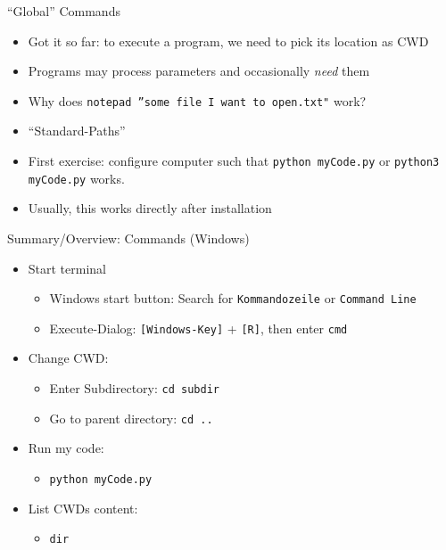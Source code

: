 \begin{frame}{\enquote{Global} Commands}
%
\begin{itemize}
\item Got it so far: to execute a program, we need to pick its location as CWD
\item Programs may process parameters and occasionally \emph{need} them
\item Why does \texttt{notepad ''some file I want to open.txt"} work?
\item[\Thus] \enquote{Standard-Paths}
\item[\Thus] First exercise: configure computer such that \texttt{python myCode.py} or \texttt{python3 myCode.py} works.
\item Usually, this works directly after installation
\end{itemize}
%
\end{frame}


\begin{frame}{Summary/Overview: Commands (Windows)}
\begin{itemize}
\item Start terminal
	\begin{itemize}
	\item Windows start button: Search for \texttt{Kommandozeile} or \texttt{Command Line}
	\item Execute-Dialog: \texttt{[Windows-Key]} + \texttt{[R]}, then enter \texttt{cmd}
	\end{itemize}
\item Change CWD:
	\begin{itemize}
	\item Enter Subdirectory: \texttt{cd subdir}
	\item Go to parent directory: \texttt{cd ..}
	\end{itemize}
\item Run my code:
	\begin{itemize}
	\item \texttt{python myCode.py}
	\end{itemize}
\item List CWDs content:
	\begin{itemize}
	\item \texttt{dir}
	\end{itemize}
\end{itemize}
\end{frame}

